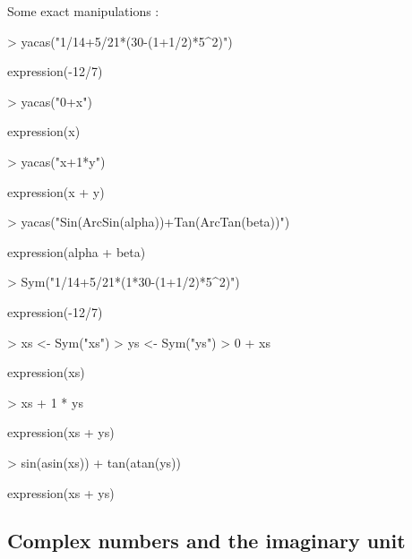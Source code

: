 \documentclass[]{article}
\begin{document}
Some exact manipulations :
\begin{Schunk}
\begin{Sinput}
> yacas("1/14+5/21*(30-(1+1/2)*5^2)")
\end{Sinput}
\begin{Soutput}
expression(-12/7)
\end{Soutput}
\begin{Sinput}
> yacas("0+x")
\end{Sinput}
\begin{Soutput}
expression(x)
\end{Soutput}
\begin{Sinput}
> yacas("x+1*y")
\end{Sinput}
\begin{Soutput}
expression(x + y)
\end{Soutput}
\begin{Sinput}
> yacas("Sin(ArcSin(alpha))+Tan(ArcTan(beta))")
\end{Sinput}
\begin{Soutput}
expression(alpha + beta)
\end{Soutput}
\end{Schunk}

\begin{Schunk}
\begin{Sinput}
> Sym("1/14+5/21*(1*30-(1+1/2)*5^2)")
\end{Sinput}
\begin{Soutput}
expression(-12/7)
\end{Soutput}
\begin{Sinput}
> xs <- Sym("xs")
> ys <- Sym("ys")
> 0 + xs
\end{Sinput}
\begin{Soutput}
expression(xs)
\end{Soutput}
\begin{Sinput}
> xs + 1 * ys
\end{Sinput}
\begin{Soutput}
expression(xs + ys)
\end{Soutput}
\begin{Sinput}
> sin(asin(xs)) + tan(atan(ys))
\end{Sinput}
\begin{Soutput}
expression(xs + ys)
\end{Soutput}
\end{Schunk}

\subsection{Complex numbers and the imaginary unit} 
\end{document}
